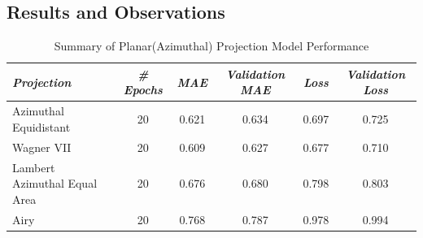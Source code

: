 \subsection{Results and Observations}
\begin{table}[ht]
    \caption{Summary of Planar(Azimuthal) Projection Model Performance}
    \label{planner_results_table}
    \renewcommand{\arraystretch}{1.2} %
    \begin{tabular}{|l|c|c|c|c|c|}
        \hline
        \rowcolor[gray]{0.9}
        \textbf{\emph{Projection}}   & \textbf{\emph{\# Epochs}} & \textbf{\emph{MAE}} & \textbf{\emph{Validation MAE}} & \textbf{\emph{Loss}} & \textbf{\emph{Validation Loss}} \\ \hline
        Azimuthal Equidistant        & 20                        & 0.621               & 0.634                          & 0.697                & 0.725                           \\ \hline
        Wagner VII                   & 20                        & 0.609               & 0.627                          & 0.677                & 0.710                           \\ \hline
        Lambert Azimuthal Equal Area & 20                        & 0.676               & 0.680                          & 0.798                & 0.803                           \\ \hline
        Airy                         & 20                        & 0.768               & 0.787                          & 0.978                & 0.994                           \\ \hline
    \end{tabular}
\end{table}
